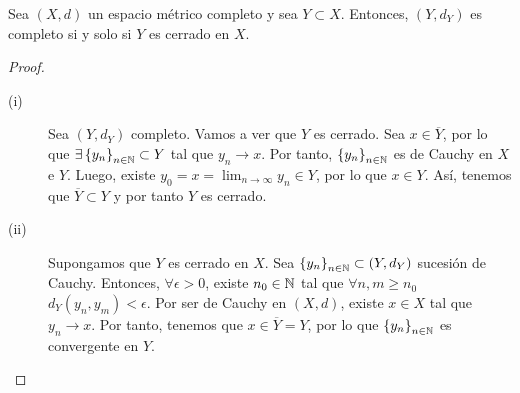 \begin{prop}
Sea $\displaystyle \left(X,d\right) $ un espacio métrico completo y sea $\displaystyle Y \subset X $. Entonces, $\displaystyle \left(Y, d _{Y}\right) $ es completo si y solo si $\displaystyle Y $ es cerrado en $\displaystyle X $.
\end{prop}
\begin{proof}
\begin{description}
	\item[(i)] Sea $\displaystyle \left(Y,d _{Y}\right) $ completo. Vamos a ver que $\displaystyle Y $ es cerrado. Sea $\displaystyle x \in \overline{Y} $, por lo que $\displaystyle \exists \left\{ y_{n}\right\} _{n\in\mathbb{N}} \subset Y $ tal que $\displaystyle y_{n} \to x $.
		Por tanto, $\displaystyle \left\{ y_{n}\right\} _{n\in\mathbb{N}} $ es de Cauchy en $\displaystyle X $ e $\displaystyle Y $. Luego, existe $\displaystyle y_{0} = x = \lim_{n \to \infty}y_{n} \in Y $, por lo que $\displaystyle x \in Y $. Así, tenemos que $\displaystyle \overline{Y} \subset Y $ y por tanto $\displaystyle Y  $ es cerrado.
	\item[(ii)] Supongamos que $\displaystyle Y $ es cerrado en $\displaystyle X $. Sea $\displaystyle \left\{ y_{n}\right\} _{n\in\mathbb{N}} \subset \left(Y, d _{Y}\right) $ sucesión de Cauchy. Entonces, $\displaystyle \forall \epsilon > 0 $, existe $\displaystyle n_{0} \in \mathbb{N} $ tal que $\displaystyle \forall n,m \geq n_{0} $ $\displaystyle d _{Y}\left(y_{n}, y_{m}\right) < \epsilon  $.
		Por ser de Cauchy en $\displaystyle \left(X,d\right) $, existe $\displaystyle x \in X $ tal que $\displaystyle y_{n} \to x $. Por tanto, tenemos que $\displaystyle x \in \overline{Y} = Y $, por lo que $\displaystyle \left\{ y_{n}\right\} _{n\in\mathbb{N}} $ es convergente en $\displaystyle Y $.
\end{description}
\end{proof}

